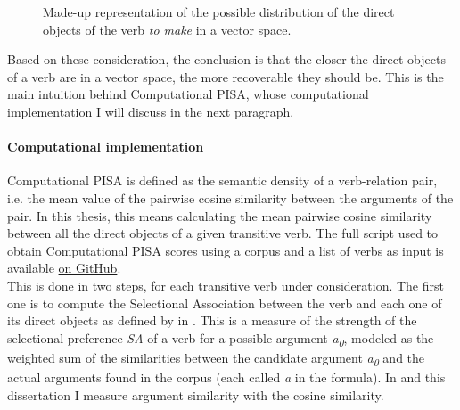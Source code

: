 \begin{figure}[htb]
\caption{Made-up representation of the possible distribution of the direct objects of the verb \textit{to make} in a vector space.}
\centering
{}
\end{figure}

Based on these consideration, the conclusion is that the closer the direct objects of a verb are in a vector space, the more recoverable they should be. This is the main intuition behind Computational PISA, whose computational implementation I will discuss in the next paragraph.

\paragraph{Computational implementation} Computational PISA is defined as the semantic density of a verb-relation pair, i.e. the mean value of the pairwise cosine similarity between the arguments of the pair. In this thesis, this means calculating the mean pairwise cosine similarity between all the direct objects of a given transitive verb. The full script used to obtain Computational PISA scores using a corpus and a list of verbs as input is available \href{https://github.com/ellepannitto/PISA}{on GitHub}. \\
This is done in two steps, for each transitive verb under consideration. The first one is to compute the Selectional Association between the verb and each one of its direct objects as defined by \textcite{Erk2007, ErkEtAl2010} in . This is a measure of the strength of the selectional preference \textit{SA} of a verb for a possible argument \textit{a\textsubscript{0}}, modeled as the weighted sum of the similarities between the candidate argument \textit{a\textsubscript{0}} and the actual arguments found in the corpus (each called \textit{a} in the formula). In \textcite{CappelliLenciPISA} and this dissertation I measure argument similarity with the cosine similarity.

